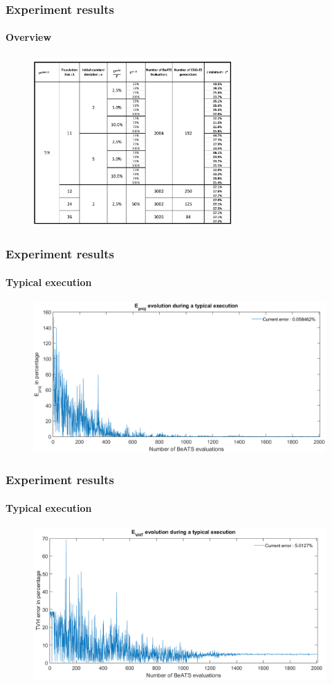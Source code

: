 \documentclass[fleqn]{beamer}
\begin{document}
\begin{frame}
	\frametitle{Experiment results}
	\framesubtitle{Overview}
	\begin{figure}
		\centering
		\includegraphics[width=3in]{figures/results_array.png}
	\end{figure}
\end{frame}
	
\begin{frame}
	\frametitle{Experiment results}
	\framesubtitle{Typical execution}
	\begin{figure}
		\centering
		\includegraphics[width=4.5in]{figures/results_figures/eprojexample.png}
	\end{figure}
\end{frame}

\begin{frame}
	\frametitle{Experiment results}
	\framesubtitle{Typical execution}
	\begin{figure}
		\centering
		\includegraphics[width=4.5in]{figures/results_figures/VHTexample.png}
	\end{figure}
\end{frame}
\end{document}
